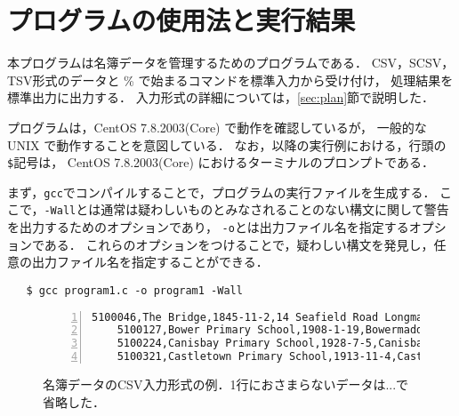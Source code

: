 \section{プログラムの使用法と実行結果}\label{sec:howresult}

本プログラムは名簿データを管理するためのプログラムである．
CSV，SCSV，TSV形式のデータと \% で始まるコマンドを標準入力から受け付け，
処理結果を標準出力に出力する．
入力形式の詳細については，\ref{sec:plan}節で説明した．

プログラムは，CentOS 7.8.2003(Core) で動作を確認しているが，
一般的な UNIX で動作することを意図している．
なお，以降の実行例における，行頭の\verb|$|記号は，
CentOS 7.8.2003(Core) におけるターミナルのプロンプトである．

まず，\verb|gcc|でコンパイルすることで，プログラムの実行ファイルを生成する．
ここで，\verb|-Wall|とは通常は疑わしいものとみなされることのない構文に関して警告を出力するためのオプションであり，
\verb|-o|とは出力ファイル名を指定するオプションである．
これらのオプションをつけることで，疑わしい構文を発見し，任意の出力ファイル名を指定することができる．

{\fontsize{10pt}{11pt} \selectfont
 \begin{verbatim}
   $ gcc program1.c -o program1 -Wall
 \end{verbatim}
}


\begin{figure}[t]
\centering %
\begin{Verbatim}[frame=single, xleftmargin=5mm, xrightmargin=5mm, gobble=4,
                 fontsize=\small, numbers=left, firstnumber=1]
    5100046,The Bridge,1845-11-2,14 Seafield Road Longman Inverness,SEN Unit 2.0 Open
    5100127,Bower Primary School,1908-1-19,Bowermadden Bower Caithness,01955 641225 ...
    5100224,Canisbay Primary School,1928-7-5,Canisbay Wick,01955 611337 Primary 56 3...
    5100321,Castletown Primary School,1913-11-4,Castletown Thurso,01847 821256 01847...
\end{Verbatim}
    \caption{名簿データのCSV入力形式の例．1行におさまらないデータは...で省略した．}
    \label{fig:csvdata}
\end{figure}

